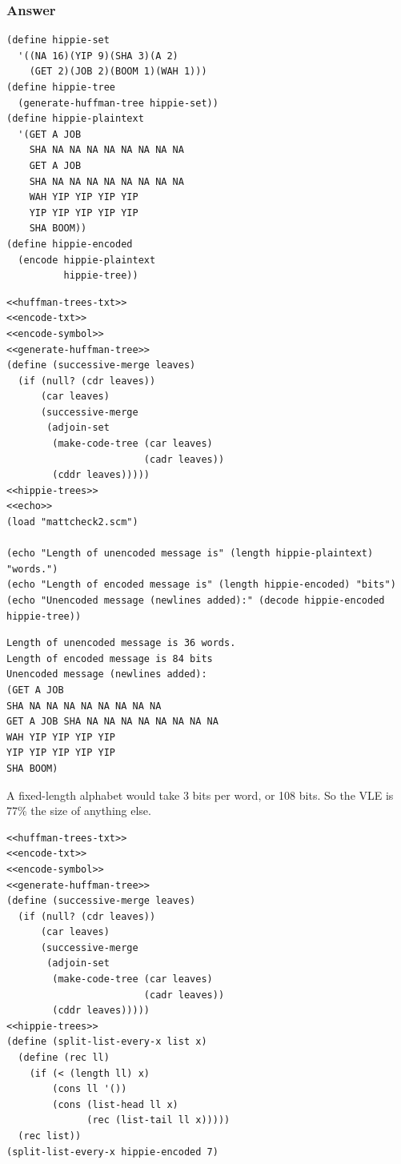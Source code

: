 \documentclass[final,fleqn,titlepage,twoside]{article}
\begin{document}
\subsubsection{Answer}
\label{sec:org4819dc2}
\begin{verbatim}
(define hippie-set
  '((NA 16)(YIP 9)(SHA 3)(A 2)
    (GET 2)(JOB 2)(BOOM 1)(WAH 1)))
(define hippie-tree
  (generate-huffman-tree hippie-set))
(define hippie-plaintext
  '(GET A JOB
    SHA NA NA NA NA NA NA NA NA
    GET A JOB
    SHA NA NA NA NA NA NA NA NA
    WAH YIP YIP YIP YIP
    YIP YIP YIP YIP YIP
    SHA BOOM))
(define hippie-encoded
  (encode hippie-plaintext
          hippie-tree))
\end{verbatim}
\begin{verbatim}
<<huffman-trees-txt>>
<<encode-txt>>
<<encode-symbol>>
<<generate-huffman-tree>>
(define (successive-merge leaves)
  (if (null? (cdr leaves))
      (car leaves)
      (successive-merge
       (adjoin-set
        (make-code-tree (car leaves)
                        (cadr leaves))
        (cddr leaves)))))
<<hippie-trees>>
<<echo>>
(load "mattcheck2.scm")

(echo "Length of unencoded message is" (length hippie-plaintext) "words.")
(echo "Length of encoded message is" (length hippie-encoded) "bits")
(echo "Unencoded message (newlines added):" (decode hippie-encoded hippie-tree))
\end{verbatim}

\begin{verbatim}
Length of unencoded message is 36 words. 
Length of encoded message is 84 bits 
Unencoded message (newlines added):
(GET A JOB
SHA NA NA NA NA NA NA NA NA
GET A JOB SHA NA NA NA NA NA NA NA NA
WAH YIP YIP YIP YIP
YIP YIP YIP YIP YIP
SHA BOOM) 
\end{verbatim}

A fixed-length alphabet would take 3 bits per word, or 108 bits. So the VLE is
77\% the size of anything else.

\begin{verbatim}
<<huffman-trees-txt>>
<<encode-txt>>
<<encode-symbol>>
<<generate-huffman-tree>>
(define (successive-merge leaves)
  (if (null? (cdr leaves))
      (car leaves)
      (successive-merge
       (adjoin-set
        (make-code-tree (car leaves)
                        (cadr leaves))
        (cddr leaves)))))
<<hippie-trees>>
(define (split-list-every-x list x)
  (define (rec ll)
    (if (< (length ll) x)
        (cons ll '())
        (cons (list-head ll x)
              (rec (list-tail ll x)))))
  (rec list))
(split-list-every-x hippie-encoded 7)
\end{verbatim}
\end{document}
